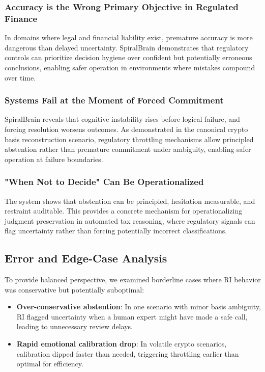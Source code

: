 \documentclass[12pt,a4paper]{article}
\begin{document}
\subsubsection{Accuracy is the Wrong Primary Objective in Regulated Finance}

In domains where legal and financial liability exist, premature accuracy is more dangerous than delayed uncertainty. SpiralBrain demonstrates that regulatory controls can prioritize decision hygiene over confident but potentially erroneous conclusions, enabling safer operation in environments where mistakes compound over time.

\subsubsection{Systems Fail at the Moment of Forced Commitment}

SpiralBrain reveals that cognitive instability rises before logical failure, and forcing resolution worsens outcomes. As demonstrated in the canonical crypto basis reconstruction scenario, regulatory throttling mechanisms allow principled abstention rather than premature commitment under ambiguity, enabling safer operation at failure boundaries.

\subsubsection{"When Not to Decide" Can Be Operationalized}

The system shows that abstention can be principled, hesitation measurable, and restraint auditable. This provides a concrete mechanism for operationalizing judgment preservation in automated tax reasoning, where regulatory signals can flag uncertainty rather than forcing potentially incorrect classifications.

\subsection{Error and Edge-Case Analysis}

To provide balanced perspective, we examined borderline cases where RI behavior was conservative but potentially suboptimal:

\begin{itemize}
    \item \textbf{Over-conservative abstention}: In one scenario with minor basis ambiguity, RI flagged uncertainty when a human expert might have made a safe call, leading to unnecessary review delays.

    \item \textbf{Rapid emotional calibration drop}: In volatile crypto scenarios, calibration dipped faster than needed, triggering throttling earlier than optimal for efficiency.
\end{itemize}
\end{document}
